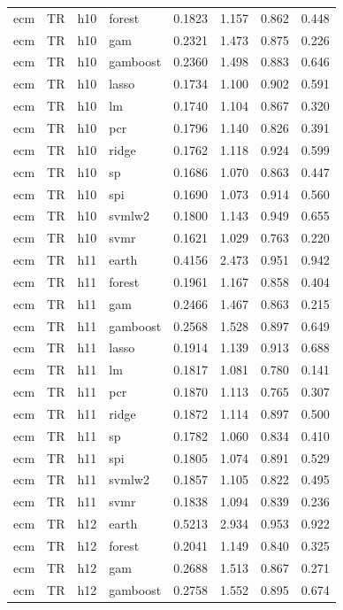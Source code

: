 \begin{ThreePartTable}
\begin{longtable}[t]{llclcccc}
ecm & TR & h10 & forest & 0.1823 & 1.157 & 0.862 & 0.448\\
ecm & TR & h10 & gam & 0.2321 & 1.473 & 0.875 & 0.226\\
ecm & TR & h10 & gamboost & 0.2360 & 1.498 & 0.883 & 0.646\\
ecm & TR & h10 & lasso & 0.1734 & 1.100 & 0.902 & 0.591\\
ecm & TR & h10 & lm & 0.1740 & 1.104 & 0.867 & 0.320\\
ecm & TR & h10 & pcr & 0.1796 & 1.140 & 0.826 & 0.391\\
ecm & TR & h10 & ridge & 0.1762 & 1.118 & 0.924 & 0.599\\
ecm & TR & h10 & sp & 0.1686 & 1.070 & 0.863 & 0.447\\
ecm & TR & h10 & spi & 0.1690 & 1.073 & 0.914 & 0.560\\
ecm & TR & h10 & svmlw2 & 0.1800 & 1.143 & 0.949 & 0.655\\
ecm & TR & h10 & svmr & 0.1621 & 1.029 & 0.763 & 0.220\\
\addlinespace
ecm & TR & h11 & earth & 0.4156 & 2.473 & 0.951 & 0.942\\
ecm & TR & h11 & forest & 0.1961 & 1.167 & 0.858 & 0.404\\
ecm & TR & h11 & gam & 0.2466 & 1.467 & 0.863 & 0.215\\
ecm & TR & h11 & gamboost & 0.2568 & 1.528 & 0.897 & 0.649\\
ecm & TR & h11 & lasso & 0.1914 & 1.139 & 0.913 & 0.688\\
ecm & TR & h11 & lm & 0.1817 & 1.081 & 0.780 & 0.141\\
ecm & TR & h11 & pcr & 0.1870 & 1.113 & 0.765 & 0.307\\
ecm & TR & h11 & ridge & 0.1872 & 1.114 & 0.897 & 0.500\\
ecm & TR & h11 & sp & 0.1782 & 1.060 & 0.834 & 0.410\\
ecm & TR & h11 & spi & 0.1805 & 1.074 & 0.891 & 0.529\\
ecm & TR & h11 & svmlw2 & 0.1857 & 1.105 & 0.822 & 0.495\\
ecm & TR & h11 & svmr & 0.1838 & 1.094 & 0.839 & 0.236\\
\addlinespace
ecm & TR & h12 & earth & 0.5213 & 2.934 & 0.953 & 0.922\\
ecm & TR & h12 & forest & 0.2041 & 1.149 & 0.840 & 0.325\\
ecm & TR & h12 & gam & 0.2688 & 1.513 & 0.867 & 0.271\\
ecm & TR & h12 & gamboost & 0.2758 & 1.552 & 0.895 & 0.674\\

\end{longtable}
\end{ThreePartTable}
